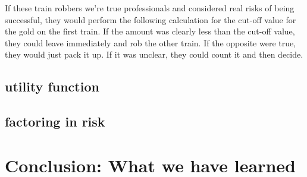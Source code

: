 \documentclass[12pt]{article}
\begin{document}
If these train robbers we're true professionals and considered real risks of being successful, they would perform 
the following calculation for the cut-off value for the gold on the first train. If the amount was clearly less than the
cut-off value, they could leave immediately and rob the other train. If the opposite were true, they would just pack it up.
If it was unclear, they could count it and then decide. 

\subsection{utility function}

\subsection{factoring in risk}

\section{Conclusion: What we have learned}
\end{document}
